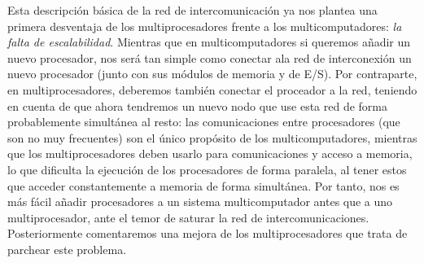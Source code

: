 Esta descripción básica de la red de intercomunicación ya nos plantea una primera desventaja de los multiprocesadores frente a los multicomputadores: \emph{la falta de escalabilidad}. Mientras que en multicomputadores si queremos añadir un nuevo procesador, nos será tan simple como conectar ala red de interconexión un nuevo procesador (junto con sus módulos de memoria y de E/S). Por contraparte, en multiprocesadores, deberemos también conectar el proceador a la red, teniendo en cuenta de que ahora tendremos un nuevo nodo que use esta red de forma probablemente simultánea al resto: las comunicaciones entre procesadores (que son no muy frecuentes) son el único propósito de los multicomputadores, mientras que los multiprocesadores deben usarlo para comunicaciones y acceso a memoria, lo que dificulta la ejecución de los procesadores de forma paralela, al tener estos que acceder constantemente a memoria de forma simultánea. Por tanto, nos es más fácil añadir procesadores a un sistema multicomputador antes que a uno multiprocesador, ante el temor de saturar la red de intercomunicaciones. Posteriormente comentaremos una mejora de los multiprocesadores que trata de parchear este problema.

